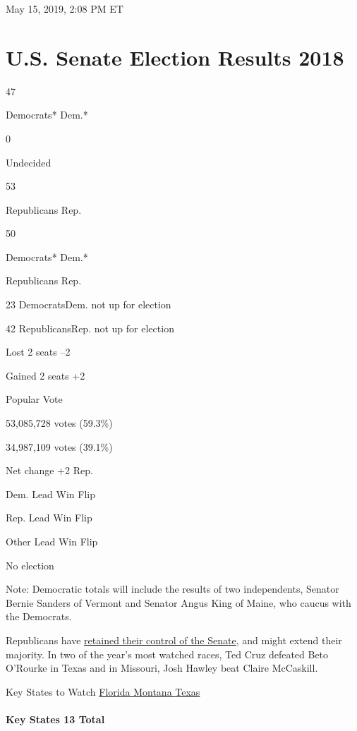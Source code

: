 May 15, 2019, 2:08 PM ET

\hypertarget{us-senate-election-results-2018}{%
\section{U.S. Senate Election Results
2018}\label{us-senate-election-results-2018}}

47

Democrats* Dem.*

0

Undecided

53

Republicans Rep.

50

Democrats* Dem.*

Republicans Rep.

23 DemocratsDem. not up for election

42 RepublicansRep. not up for election

Lost 2 seats --2

Gained 2 seats +2

Popular Vote

53,085,728 votes (59.3\%)

34,987,109 votes (39.1\%)

Net change +2 Rep.

Dem. Lead Win Flip

Rep. Lead Win Flip

Other Lead Win Flip

No election

Note: Democratic totals will include the results of two independents,
Senator Bernie Sanders of Vermont and Senator Angus King of Maine, who
caucus with the Democrats.

Republicans have
\href{https://www.nytimes3xbfgragh.onion/2018/11/06/us/politics/midterm-elections-results.html}{retained
their control of the Senate}, and might extend their majority. In two of
the year's most watched races, Ted Cruz defeated Beto O'Rourke in Texas
and in Missouri, Josh Hawley beat Claire McCaskill.

Key States to Watch
\href{https://www.nytimes3xbfgragh.onion/interactive/2018/11/06/us/elections/results-florida-elections.html}{Florida
}\href{https://www.nytimes3xbfgragh.onion/interactive/2018/11/06/us/elections/results-montana-elections.html}{Montana
}\href{https://www.nytimes3xbfgragh.onion/interactive/2018/11/06/us/elections/results-texas-elections.html}{Texas}

\hypertarget{key-states-13-total}{%
\paragraph{Key States 13 Total}\label{key-states-13-total}}

